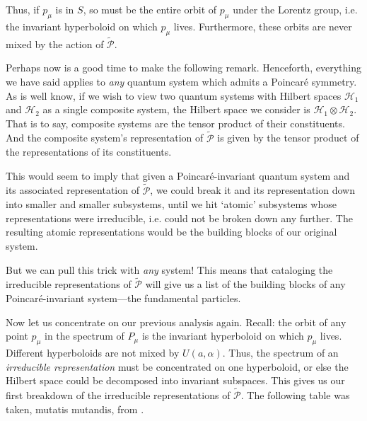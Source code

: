 \documentclass[a4paper,10pt]{scrreprt}
\theoremstyle{definition}
\theoremstyle{plain}
\theoremstyle{remark}
\begin{document}
Thus, if $p_{\mu}$ is in $S$, so must be the entire orbit of $p_{\mu}$ under the Lorentz group, i.e. the invariant hyperboloid on which $p_{\mu}$ lives. Furthermore, these orbits are never mixed by the action of $\widetilde{\mathcal{P}}$.

Perhaps now is a good time to make the following remark. Henceforth, everything we have said applies to \emph{any} quantum system which admits a Poincar{\'e} symmetry. As is well know, if we wish to view two quantum systems with Hilbert spaces $\mathscr{H}_{1}$ and $\mathscr{H}_{2}$ as a single composite system, the Hilbert space we consider is $\mathscr{H}_{1} \otimes \mathscr{H}_{2}$. That is to say, composite systems are the tensor product of their constituents. And the composite system's representation of $\widetilde{\mathcal{P}}$ is given by the tensor product of the representations of its constituents.

This would seem to imply that given a Poincar{\'e}-invariant quantum system and its associated representation of $\widetilde{\mathcal{P}}$, we could break it and its representation down into smaller and smaller subsystems, until we hit `atomic' subsystems whose representations were irreducible, i.e. could not be broken down any further. The resulting atomic representations would be the building blocks of our original system. 

But we can pull this trick with \emph{any} system! This means that cataloging the irreducible representations of $\widetilde{\mathcal{P}}$ will give us a list of the building blocks of any Poincar{\'e}-invariant system---the fundamental particles.

Now let us concentrate on our previous analysis again. Recall: the orbit of any point $p_{\mu}$ in the spectrum of $P_{\mu}$ is the invariant hyperboloid on which $p_{\mu}$ lives. Different hyperboloids are not mixed by $U(a, \alpha)$. Thus, the spectrum of an \emph{irreducible representation} must be concentrated on one hyperboloid, or else the Hilbert space could be decomposed into invariant subspaces. This gives us our first breakdown of the irreducible representations of $\widetilde{\mathcal{P}}$. The following table was taken, mutatis mutandis, from \cite{haag-local-quantum-physics}.
\end{document}
